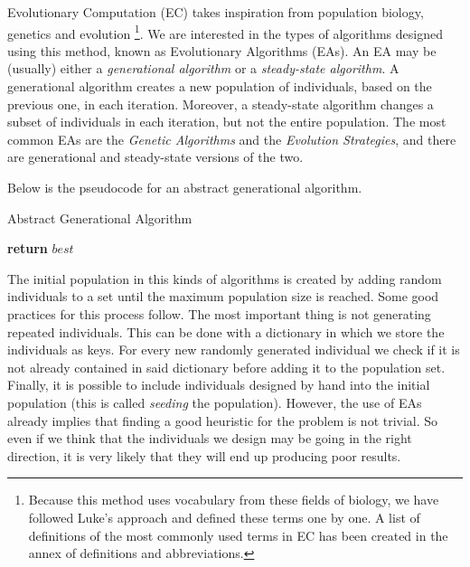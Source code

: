 Evolutionary Computation (EC) \cite{luke13metaheuristics} takes inspiration from population biology, genetics and evolution \footnote{Because this method uses vocabulary from these fields of biology, we have followed Luke's approach and defined these terms one by one. A list of definitions of the most commonly used terms in EC has been created in the annex of definitions and abbreviations.}. We are interested in the types of algorithms designed using this method, known as Evolutionary Algorithms (EAs). An EA may be (usually) either a \textit{generational algorithm} or a \textit{steady-state algorithm}.  A generational algorithm creates a new population of individuals, based on the previous one, in each iteration. Moreover, a steady-state algorithm changes a subset of individuals in each iteration, but not the entire population. The most common EAs are the \textit{Genetic Algorithms} and the \textit{Evolution Strategies}, and there are generational and steady-state versions of the two.

Below is the pseudocode for an abstract generational algorithm.

\begin{algorithm}[H]
    \caption{Abstract Generational Algorithm}
    \begin{algorithmic}[1]
                    \EndIf
                \EndFor
            \EndWhile
            \State \textbf{return} $best$
        \EndProcedure
    \end{algorithmic}
\end{algorithm}

The initial population in this kinds of algorithms is created by adding random individuals to a set until the maximum population size is reached. Some good practices for this process follow. The most important thing is not generating repeated individuals. This can be done with a dictionary in which we store the individuals as keys. For every new randomly generated individual we check if it is not already contained in said dictionary before adding it to the population set. Finally, it is possible to include individuals designed by hand into the initial population (this is called \textit{seeding} the population). However, the use of EAs already implies that finding a good heuristic for the problem is not trivial. So even if we think that the individuals we design may be going in the right direction, it is very likely that they will end up producing poor results.

